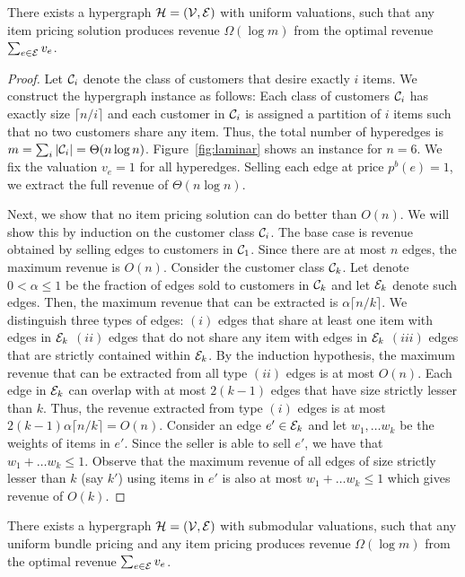 \begin{lemma} \label{lem:lb2}
There exists a hypergraph $\mathcal{H} = (\mathcal{V}, \mathcal{E})$ with uniform valuations, such that any item pricing solution produces revenue $\Omega(\log m)$ from the optimal revenue
$\sum_{e \in \mathcal{E}} v_e$.
\end{lemma}
\begin{proof}
	Let $\mathcal{C}_i$ denote the class of customers that desire exactly $i $ items. We construct the hypergraph instance as follows: Each class of customers $\mathcal{C}_i$ has 
	exactly size $\lceil n/i \rceil$ and each customer in $\mathcal{C}_i$ is assigned a partition of $i$ items such that no two customers share any item. Thus, the total number of hyperedges is $m = \sum_{i} \vert \mathcal{C}_i \vert = \Theta( n \log n)$. Figure~\ref{fig:laminar} shows  an instance for $n=6$. We fix the valuation $v_e = 1$ for all hyperedges. Selling each edge at price $p^{b}(e) = 1$, we extract the full revenue of $\Theta(n \log n)$.
	
	Next, we show that no item pricing solution can do better than $O(n)$. We will show this by induction on the customer class $\mathcal{C}_i$. The base case is revenue obtained by selling edges to customers in $\mathcal{C}_1$. Since there are at most $n$ edges, the maximum revenue is $O(n)$. Consider the customer class $\mathcal{C}_k$. Let denote $0 < \alpha \leq 1$ be the fraction of edges sold to customers in $\mathcal{C}_k$ and let $\mathcal{E}_k$ denote such edges. Then, the maximum revenue that can be extracted is $\alpha \lceil n/k \rceil$. We distinguish three types of edges: $(i)$ edges that share at least one item with edges in $\mathcal{E}_k$ $(ii)$ edges that do not share any item with edges in $\mathcal{E}_k$ $(iii)$ edges that are strictly contained within $\mathcal{E}_k$. By the induction hypothesis, the maximum revenue that can be extracted from all type $(ii)$ edges is at most $O(n)$. Each edge in $\mathcal{E}_k$ can overlap with at most $2(k-1)$ edges that have size strictly lesser than $k$. Thus, the revenue extracted from type $(i)$ edges is at most $2(k-1) \alpha \lceil n/k \rceil = O(n)$. Consider an edge $e' \in \mathcal{E}_k$ and let $w_1, \dots w_k$ be the weights of items in $e'$. Since the seller is able to sell $e'$, we have that $w_1 + \dots w_k \leq 1$. Observe that the maximum revenue of all edges of size strictly lesser than $k$ (say $k'$) using items in $e'$ is also at most $w_1 + \dots w_k \leq 1$ which gives revenue of $O(k)$. 
\end{proof}




\begin{lemma} \label{lem:lb3}
There exists a hypergraph $\mathcal{H} = (\mathcal{V}, \mathcal{E})$ with submodular valuations, such that any uniform bundle pricing and any item pricing produces revenue $\Omega(\log m)$ from the optimal revenue
$\sum_{e \in \mathcal{E}} v_e$.
\end{lemma}	



